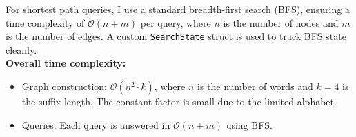 \documentclass{article}
\begin{document}
\clearpage
  For shortest path queries, I use a standard breadth-first search (BFS), ensuring a time complexity of $\mathcal{O}(n + m)$ per query, where $n$ is the number of nodes and $m$ is the number of edges. A custom \texttt{SearchState} struct is used to track BFS state cleanly.\\

  \textbf{Overall time complexity:}
  \begin{itemize}
    \item Graph construction: $\mathcal{O}(n^2 \cdot k)$, where $n$ is the number of words and $k = 4$ is the suffix length. The constant factor is small due to the limited alphabet.
    \item Queries: Each query is answered in $\mathcal{O}(n + m)$ using BFS.
  \end{itemize}
\end{document}
